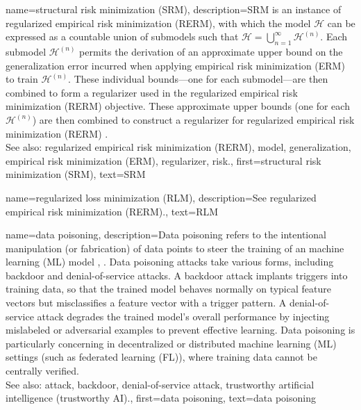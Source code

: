 {
{name={structural risk minimization (SRM)}, 
	description={SRM is an
		instance of regularized empirical risk minimization (RERM), with which the model $\mathcal{H}$ can be expressed 
		as a countable union of submodels such that $\mathcal{H} = \bigcup_{n=1}^{\infty} \mathcal{H}^{(n)}$. 
		Each submodel $\mathcal{H}^{(n)}$ permits the derivation of an approximate upper bound 
		on the generalization error incurred when applying empirical risk minimization (ERM) to train $\mathcal{H}^{(n)}$. 
		These individual bounds—one for each submodel—are then combined to form a regularizer 
		used in the regularized empirical risk minimization (RERM) objective. 
        		These approximate upper bounds (one for each $\mathcal{H}^{(n)}$) are then combined 
		to construct a regularizer for regularized empirical risk minimization (RERM) \cite[Sec.\ 7.2]{ShalevMLBook}.
				\\
		See also: regularized empirical risk minimization (RERM), model, generalization, empirical risk minimization (ERM), regularizer, risk.},
	first={structural risk minimization (SRM)},
	text={SRM}
 }

 {name={regularized loss minimization (RLM)},
 	description={See regularized empirical risk minimization (RERM).},
 	text={RLM}
 }
 

{name={data poisoning}, 
	description={Data poisoning refers to the intentional manipulation 
  		(or fabrication) of data points to steer the training of an machine learning (ML) model \cite{Liu2021}, \cite{PoisonGAN}. 
  		Data poisoning attacks take various forms, including backdoor and denial-of-service attacks.
  		A backdoor attack implants triggers into training data, so that the trained model 
  		behaves normally on typical feature vectors but misclassifies a feature vector with a trigger pattern.
  		A denial-of-service attack degrades the trained model's overall performance by injecting mislabeled or 
  		adversarial examples to prevent effective learning.
		Data poisoning is particularly concerning in decentralized or distributed machine learning (ML) settings (such as federated learning (FL)), 
		where training data cannot be centrally verified.
				\\
		See also: attack, backdoor, denial-of-service attack, trustworthy artificial intelligence (trustworthy AI).},
	first={data poisoning},
	text={data poisoning} 
}
	
}
